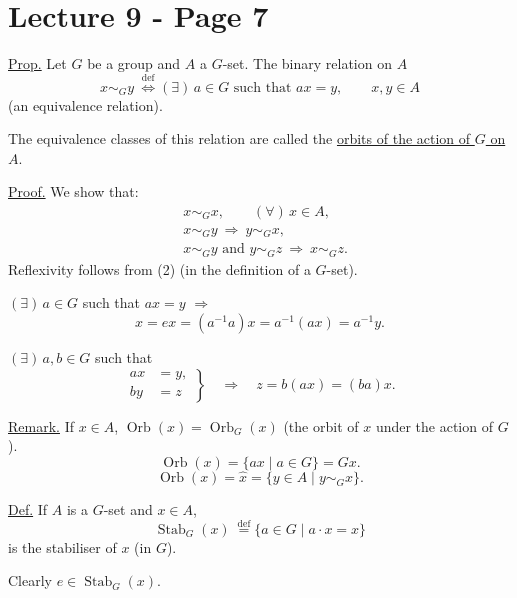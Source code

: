 
\section*{Lecture 9 - Page 7}

\noindent\underline{Prop.} Let $G$ be a group and $A$ a $G$-set. The binary relation on $A$
\[
x\sim_G y\ \overset{\mathrm{def}}{\Longleftrightarrow}
(\exists)\,a\in G\text{ such that }a x=y,\qquad x,y\in A
\]
\noindent (an equivalence relation).

\bigskip
\noindent The equivalence classes of this relation are called the
\underline{orbits of the action of $G$ on $A$}.

\bigskip
\noindent\underline{Proof.} We show that:
\begin{align*}
&x\sim_G x,\qquad (\forall)\,x\in A,\\
&x\sim_G y\ \Longrightarrow\ y\sim_G x,\\
&x\sim_G y\text{ and }y\sim_G z\ \Longrightarrow\ x\sim_G z.
\end{align*}
\noindent Reflexivity follows from (2) (in the definition of a $G$-set).

\bigskip
\noindent $(\exists)\,a\in G$ such that $a x=y$ $\Longrightarrow$
\[
x=e x=(a^{-1}a)x=a^{-1}(a x)=a^{-1}y.
\]

\bigskip
\noindent $(\exists)\,a,b\in G$ such that
\[
\left.\begin{aligned}
 a x&=y,\\
 b y&=z
\end{aligned}\right\}
\quad\Longrightarrow\quad z=b(a x)=(ba)x.
\]

\bigskip
\noindent\underline{Remark.} If $x\in A$, $\operatorname{Orb}(x)=\operatorname{Orb}_G(x)$
(the orbit of $x$ under the action of $G$).
\[
\operatorname{Orb}(x)=\{a x\mid a\in G\}=Gx.
\]
\[
\operatorname{Orb}(x)=\widehat{x}
=\{y\in A\mid y\sim_G x\}.
\]

\bigskip
\noindent\underline{Def.} If $A$ is a $G$-set and $x\in A$,
\[
\operatorname{Stab}_G(x)\ \overset{\mathrm{def}}{=}
\{a\in G\mid a\cdot x=x\}
\]
\noindent is the stabiliser of $x$ (in $G$).

\noindent Clearly $e\in\operatorname{Stab}_G(x)$.

